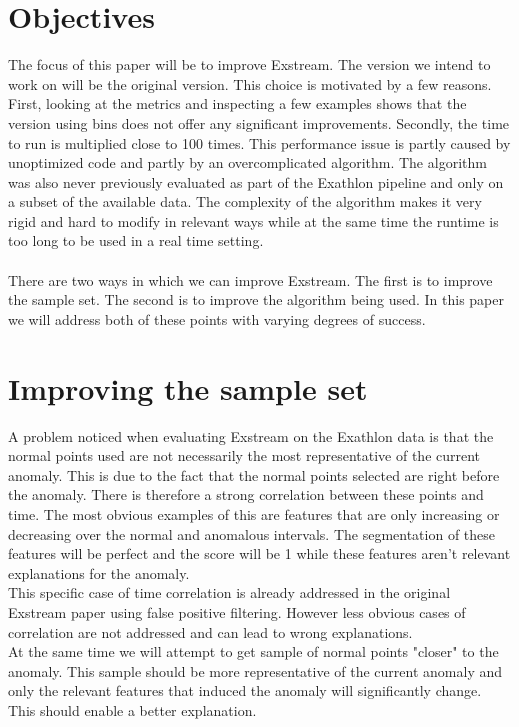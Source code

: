 \documentclass[oneside, a4paper, onecolumn, 11pt]{article}
\begin{document}
\section{Objectives}
The focus of this paper will be to improve Exstream. The version we intend to work on will be the original version. This choice is motivated by a few reasons. \\
First, looking at the metrics and inspecting a few examples shows that the version using bins does not offer any significant improvements. 
Secondly, the time to run is multiplied close to 100 times. This performance issue is partly caused by unoptimized code and partly by an overcomplicated algorithm. The algorithm was also never previously evaluated as part of the Exathlon pipeline and only on a subset of the available data. 
The complexity of the algorithm makes it very rigid and hard to modify in relevant ways while at the same time the runtime is too long to be used in a real time setting.\\\\
There are two ways in which we can improve Exstream. The first is to improve the sample set. The second is to improve the algorithm being used. In this paper we will address both of these points with varying degrees of success.\\
\section{Improving the sample set}
A problem noticed when evaluating Exstream on the Exathlon data is that the normal points used are not necessarily the most representative of the current anomaly. This is due to the fact that the normal points selected are right before the anomaly. There is therefore a strong correlation between these points and time. The most obvious examples of this are features that are only increasing or decreasing over the normal and anomalous intervals. The segmentation of these features will be perfect and the score will be 1 while these features aren't relevant explanations for the anomaly.\\
This specific case of time correlation is already addressed in the original Exstream paper using false positive filtering. However less obvious cases of correlation are not addressed and can lead to wrong explanations.\\
At the same time we will attempt to get sample of normal points "closer" to the anomaly. This sample should be more representative of the current anomaly and only the relevant features that induced the anomaly will significantly change. This should enable a better explanation.\\
\end{document}
